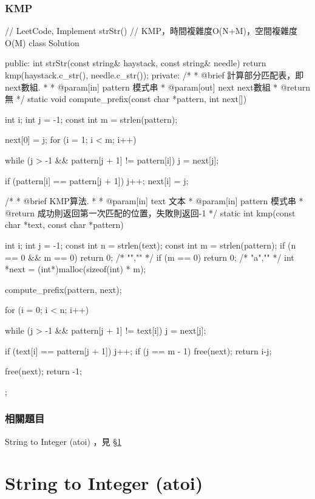 \subsubsection{KMP}
\begin{Code}
// LeetCode, Implement strStr()
// KMP，時間複雜度O(N+M)，空間複雜度O(M)
class Solution {
public:
    int strStr(const string& haystack, const string& needle) {
        return kmp(haystack.c_str(), needle.c_str());
    }
private:
    /*
     * @brief 計算部分匹配表，即next數組.
     *
     * @param[in] pattern 模式串
     * @param[out] next next數組
     * @return 無
     */
    static void compute_prefix(const char *pattern, int next[]) {
        int i;
        int j = -1;
        const int m = strlen(pattern);

        next[0] = j;
        for (i = 1; i < m; i++) {
            while (j > -1 && pattern[j + 1] != pattern[i]) j = next[j];

            if (pattern[i] == pattern[j + 1]) j++;
            next[i] = j;
        }
    }

    /*
     * @brief KMP算法.
     *
     * @param[in] text 文本
     * @param[in] pattern 模式串
     * @return 成功則返回第一次匹配的位置，失敗則返回-1
     */
    static int kmp(const char *text, const char *pattern) {
        int i;
        int j = -1;
        const int n = strlen(text);
        const int m = strlen(pattern);
        if (n == 0 && m == 0) return 0; /* "","" */
        if (m == 0) return 0;  /* "a","" */
        int *next = (int*)malloc(sizeof(int) * m);

        compute_prefix(pattern, next);

        for (i = 0; i < n; i++) {
            while (j > -1 && pattern[j + 1] != text[i]) j = next[j];

            if (text[i] == pattern[j + 1]) j++;
            if (j == m - 1) {
                free(next);
                return i-j;
            }
        }

        free(next);
        return -1;
    }
};
\end{Code}


\subsubsection{相關題目}
\begindot
\item String to Integer (atoi) ，見 \S \ref{sec:string-to-integer}
\myenddot


\section{String to Integer (atoi)} %
\label{sec:string-to-integer}


